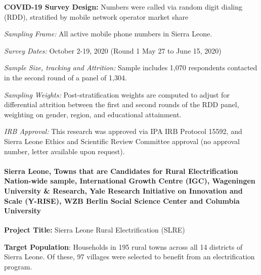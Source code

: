 \documentclass[
  12pt,
]{article}
\begin{document}
\textbf{COVID-19 Survey Design:} Numbers were called via random digit dialing (RDD), stratified by mobile network operator market share

\emph{Sampling Frame:} All active mobile phone numbers in Sierra Leone.

\emph{Survey Dates:} October 2-19, 2020 (Round 1 May 27 to June 15, 2020)

\emph{Sample Size, tracking and Attrition:} Sample includes 1,070 respondents contacted in the second round of a panel of 1,304.

\emph{Sampling Weights:} Post-stratification weights are computed to adjust for differential attrition between the first and second rounds of the RDD panel, weighting on gender, region, and educational attainment.

\emph{IRB Approval:} This research was approved via IPA IRB Protocol 15592, and Sierra Leone Ethics and Scientific Review Committee approval (no approval number, letter available upon request).

\hypertarget{sierra-leone-towns-that-are-candidates-for-rural-electrification-nation-wide-sample-international-growth-centre-igc-wageningen-university-research-yale-research-initiative-on-innovation-and-scale-y-rise-wzb-berlin-social-science-center-and-columbia-university}{%
\paragraph*{Sierra Leone, Towns that are Candidates for Rural Electrification Nation-wide sample, International Growth Centre (IGC), Wageningen University \& Research, Yale Research Initiative on Innovation and Scale (Y-RISE), WZB Berlin Social Science Center and Columbia University}\label{sierra-leone-towns-that-are-candidates-for-rural-electrification-nation-wide-sample-international-growth-centre-igc-wageningen-university-research-yale-research-initiative-on-innovation-and-scale-y-rise-wzb-berlin-social-science-center-and-columbia-university}}

\textbf{Project Title:} Sierra Leone Rural Electrification (SLRE)

\textbf{Target Population}: Households in 195 rural towns across all 14 districts of Sierra Leone. Of these, 97 villages were selected to benefit from an electrification program.
\end{document}

